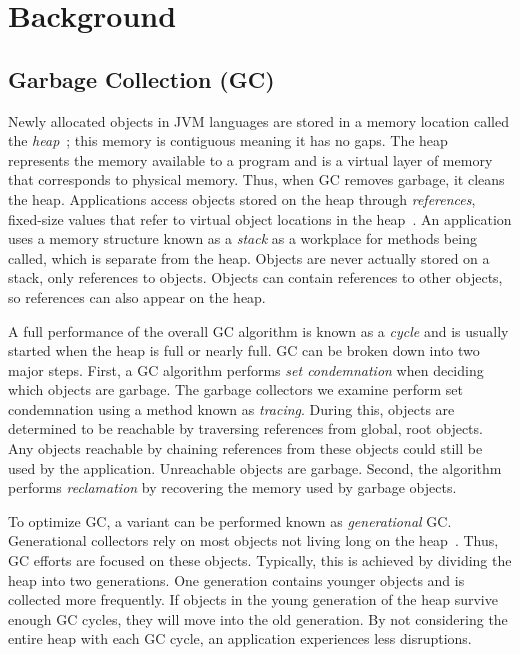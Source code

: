 \documentclass{sig-alternate}
\begin{document}
\section{Background}
\label{sec:background}


\subsection{Garbage Collection (GC)}
\label{sec:garbageCollection}

Newly allocated objects in JVM languages are stored in a memory location called
the \emph{heap}~\cite{oracle:heap}; this memory is contiguous meaning it has no gaps. The heap represents the memory available to a program and is a virtual layer of memory that corresponds to physical memory.
Thus, when GC removes garbage, it cleans the heap.
Applications access objects stored on the heap through \emph{references},
fixed-size values that refer to virtual object locations in the heap~\cite{Lindblom:2011}. 
An application uses a memory structure known
as a \emph{stack} as a workplace for methods being called, 
which is separate from the heap. Objects are never actually
stored on a stack, only references to objects.
Objects can contain references to other objects, so references can also appear on the heap.

A full
performance of the overall GC algorithm is known as a \emph{cycle} and
is usually started when the heap is full or nearly full. GC can be broken down into two major steps.
First, a GC algorithm performs \emph{set condemnation} when deciding which objects are 
garbage. The garbage collectors we examine perform set condemnation using a method 
known as \emph{tracing}. During this, objects are determined to be reachable by 
traversing references from global, root objects. Any objects reachable by chaining references
from these objects could still be used by the application. 
Unreachable objects are garbage. Second, the algorithm performs 
\emph{reclamation} by recovering the memory used by garbage objects.

To optimize GC, a variant can be performed known as \emph{generational} GC.
Generational collectors rely on most objects not living long on the 
heap~\cite{Tene:C4}. Thus, GC efforts are focused on these objects. Typically, this is achieved
by dividing the heap into two generations. One generation contains younger objects and
is collected more frequently. If objects in the young generation of the heap survive
enough GC cycles, they will move into the old generation. By not considering the entire
heap with each GC cycle, an application experiences less disruptions.
\end{document}
